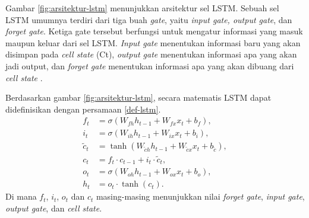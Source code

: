 Gambar \ref{fig:arsitektur-lstm} menunjukkan arsitektur sel LSTM. Sebuah sel LSTM umumnya terdiri dari tiga buah \textit{gate}, yaitu \textit{input gate, output gate}, dan \textit{forget gate}. Ketiga gate tersebut berfungsi untuk mengatur informasi yang masuk maupun keluar dari sel LSTM.
\textit{Input gate} menentukan informasi baru yang akan disimpan pada \textit{cell state} (Ct), \textit{output gate} menentukan informasi apa yang akan jadi output, dan \textit{forget gate} menentukan informasi apa yang akan dibuang dari \textit{cell state} \parencite{yuReviewRecurrentNeural2019}.

Berdasarkan gambar \ref{fig:arsitektur-lstm}, secara matematis LSTM dapat didefinisikan dengan persamaan \ref{def-lstm}.
\begin{equation}
\begin{split}
    f_t &= \sigma (W_{fh}h_{t-1} + W_{fx}x_t + b_f), \\
    i_t &= \sigma (W_{ih}h_{t-1} + W_{ix}x_t + b_i),\\
    \tilde{c}_t &= \tanh (W_{\tilde{c}h}h_{t-1} + W_{\tilde{c}x}x_t + b_{\tilde{c}}), \\
    c_t &= f_t \cdot c_{t-1}+ i_t \cdot \tilde{c}_t,\\
    o_t &= \sigma (W_{oh}h_{t-1} + W_{ox}x_t + b_o), \\
    h_t &= o_t \cdot \tanh(c_t).
\end{split}
    \label{def-lstm}
\end{equation}
\noindent
Di mana \(f_t\), \(i_t\), \(o_t\) dan \(c_t\) masing-masing menunjukkan nilai \emph{forget gate}, \emph{input gate}, \emph{output gate}, dan \emph{cell state}.


